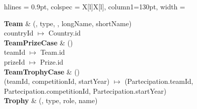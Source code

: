 \newpage

\begin{tblr}{
    hlines = {0.9pt},
    colspec = {X[l]X[l]}, column{1}={130pt},
    width = \textwidth
}

	{
		\textbf{Team}
	}
	&
	{
		(, type, , longName, shortName)\\
		\bigskip countryId $\mapsto$ Country.id
	}
	\\
	{
		\textbf{TeamPrizeCase}
	}
	&
	{
		()\\
		\bigskip teamId $\mapsto$ Team.id\\
		prizeId $\mapsto$ Prize.id
	}
	\\
	{
		\textbf{TeamTrophyCase}
	}
	&
	{
		()\\
		\bigskip (teamId, competitionId, startYear) $\mapsto$
		(Partecipation.teamId, Partecipation.competitionId,
		Partecipation.startYear)
	}
	\\
	{
		\textbf{Trophy}
	}
	&
	{
		(, type, role, name)
	}
	\\
\end{tblr}
